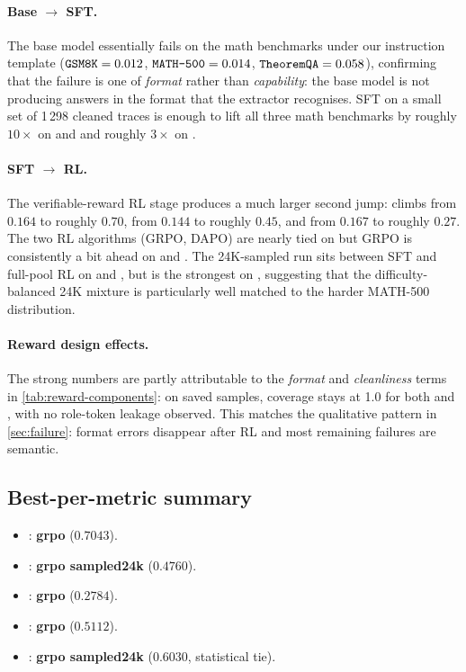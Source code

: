 \paragraph{Base $\rightarrow$ SFT.}
The base model essentially fails on the math benchmarks under our
instruction template ($\texttt{GSM8K}=0.012$, $\texttt{MATH-500}=0.014$,
$\texttt{TheoremQA}=0.058$), confirming that the failure is one of
\emph{format} rather than \emph{capability}: the base model is not
producing answers in the  format that the
 extractor recognises. SFT on a small set of 1\,298 cleaned
traces is enough to lift all three math benchmarks by roughly
$10\!\times$ on  and  and roughly
$3\!\times$ on .

\paragraph{SFT $\rightarrow$ RL.}
The verifiable-reward RL stage produces a much larger second jump:
 climbs from $0.164$ to roughly $0.70$,  from
$0.144$ to roughly $0.45$, and  from $0.167$ to roughly
$0.27$. The two RL algorithms (GRPO, DAPO) are nearly tied on
 but GRPO is consistently a bit ahead on  and
. The 24K-sampled run sits between SFT and full-pool RL on
 and , but is the strongest on
, suggesting that the difficulty-balanced 24K mixture is
particularly well matched to the harder MATH-500 distribution.

\paragraph{Reward design effects.}
The strong  numbers are partly attributable to the
\emph{format} and \emph{cleanliness} terms in \cref{tab:reward-components}:
on saved samples,  coverage stays at 1.0 for both
 and , with no role-token leakage observed. This
matches the qualitative pattern in \cref{sec:failure}: format errors
disappear after RL and most remaining failures are semantic.

\subsection{Best-per-metric summary}
\begin{itemize}
  \item {}: \textbf{grpo} ($0.7043$).
  \item {}: \textbf{grpo sampled24k} ($0.4760$).
  \item {}: \textbf{grpo} ($0.2784$).
  \item {}: \textbf{grpo} ($0.5112$).
  \item {}: \textbf{grpo sampled24k} ($0.6030$, statistical tie).
\end{itemize}
